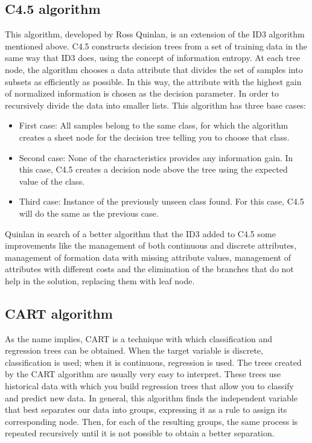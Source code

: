 \documentclass{acm_proc_article-sp}
\begin{document}
\subsection{C4.5 algorithm}
This algorithm, developed by Ross Quinlan, is an extension of the ID3 algorithm mentioned above. C4.5 constructs decision trees from a set of training data in the same way that ID3 does, using the concept of information entropy. At each tree node, the algorithm chooses a data attribute that divides the set of samples into subsets as efficiently as possible. In this way, the attribute with the highest gain of normalized information is chosen as the decision parameter. In order to recursively divide the data into smaller lists.
This algorithm has three base cases:
\begin{itemize}
\item First case: All samples belong to the same class, for which the algorithm creates a sheet node for the decision tree telling you to choose that class.
\item Second case: None of the characteristics provides any information gain. In this case, C4.5 creates a decision node above the tree using the expected value of the class.
\item Third case: Instance of the previously unseen class found. For this case, C4.5 will do the same as the previous case.
\end{itemize}
Quinlan in search of a better algorithm that the ID3 added to C4.5 some improvements like the management of both continuous and discrete attributes, management of formation data with missing attribute values, management of attributes with different costs and the elimination of the branches that do not help in the solution, replacing them with leaf node.

\subsection{CART algorithm}
As the name implies, CART is a technique with which classification and regression trees can be obtained. When the target variable is discrete, classification is used; when it is continuous, regression is used. The trees created by the CART algorithm are usually very easy to interpret. These trees use historical data with which you build regression trees that allow you to classify and predict new data.
In general, this algorithm finds the independent variable that best separates our data into groups, expressing it as a rule to assign its corresponding node. Then, for each of the resulting groups, the same process is repeated recursively until it is not possible to obtain a better separation.
\end{document}
